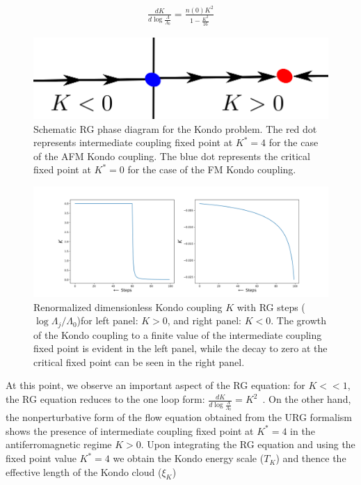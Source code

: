 \documentclass[aps,prb,preprint,groupedaddress]{revtex4-2}
\begin{document}
\begin{eqnarray}
\frac{d K}{d\log\frac{\Lambda}{\Lambda_{0}}}=\frac{n(0)K^{2}}{1-\frac{K^{2}}{16}}
\end{eqnarray}
\begin{figure}[h!]
\centering
\includegraphics[scale=0.6]{Kondo.png}
\caption{Schematic RG phase diagram for the Kondo problem. The red dot represents intermediate coupling fixed point at $K^{*}=4$ for the case of the AFM Kondo coupling. The blue dot represents the critical fixed point at $K^{*}=0$ for the case of the FM Kondo coupling.} 
\end{figure}
\begin{figure}
\centering
\includegraphics[width=\textwidth]{RG_Flow.png}
\caption{Renormalized dimensionless Kondo coupling $K$ with RG steps ($\log\Lambda_{j}/\Lambda_{0}$)for left panel: $K>0$, and right panel: $K<0$. The growth of the Kondo coupling to a finite value of the intermediate coupling fixed point is evident in the left panel, while the decay to zero at the critical fixed point can be seen in the right panel.} \label{Kondocoupling}
\end{figure}
At this point, we observe an important aspect of the RG equation: for $K<<1$, the RG equation reduces to the one loop form: $\frac{d K}{d\log\frac{\Lambda}{\Lambda_{0}}}=K^{2}$~\cite{anderson1970poor}. On the other hand, the nonperturbative form of the flow equation obtained from the URG formalism shows the presence of intermediate coupling fixed point at $K^{*}=4$ in the antiferromagnetic regime $K>0$. Upon integrating the RG equation and using the fixed point value $K^{*}=4$ we obtain the Kondo energy scale ($T_{K}$) and thence the effective length of the Kondo cloud ($\xi_{K}$)
\end{document}
